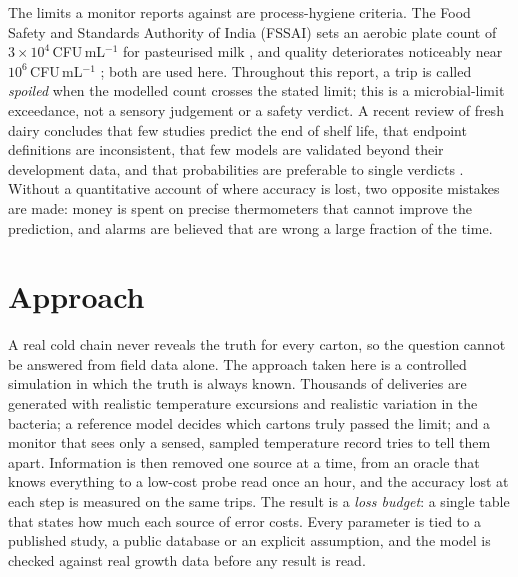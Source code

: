 \documentclass[11pt,a4paper,twoside,openany]{book}
\theoremstyle{plain}\newtheorem{proposition}{Proposition}\newtheorem{corollary}{Corollary}
\theoremstyle{definition}\newtheorem{definition}{Definition}[chapter]
\begin{document}
The limits a monitor reports against are process-hygiene criteria. The Food Safety and Standards Authority of India (FSSAI) sets an aerobic plate count of $3\times10^4$\,CFU\,mL$^{-1}$ for pasteurised milk \cite{fssai2024}, and quality deteriorates noticeably near $10^6$\,CFU\,mL$^{-1}$ \cite{martin2021,lin2016}; both are used here. Throughout this report, a trip is called \emph{spoiled} when the modelled count crosses the stated limit; this is a microbial-limit exceedance, not a sensory judgement or a safety verdict. A recent review of fresh dairy concludes that few studies predict the end of shelf life, that endpoint definitions are inconsistent, that few models are validated beyond their development data, and that probabilities are preferable to single verdicts \cite{lima2026}. Without a quantitative account of where accuracy is lost, two opposite mistakes are made: money is spent on precise thermometers that cannot improve the prediction, and alarms are believed that are wrong a large fraction of the time.

\section{Approach}
A real cold chain never reveals the truth for every carton, so the question cannot be answered from field data alone. The approach taken here is a controlled simulation in which the truth is always known. Thousands of deliveries are generated with realistic temperature excursions and realistic variation in the bacteria; a reference model decides which cartons truly passed the limit; and a monitor that sees only a sensed, sampled temperature record tries to tell them apart. Information is then removed one source at a time, from an oracle that knows everything to a low-cost probe read once an hour, and the accuracy lost at each step is measured on the same trips. The result is a \emph{loss budget}: a single table that states how much each source of error costs. Every parameter is tied to a published study, a public database or an explicit assumption, and the model is checked against real growth data before any result is read.
\end{document}
